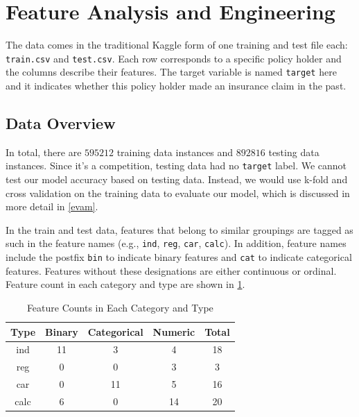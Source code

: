 \documentclass{standalone}
\begin{document}
\section{Feature Analysis and Engineering}\label{preprocessing}

The data comes in the traditional Kaggle form of one training and test file
each: \lstinline{train.csv} and \lstinline{test.csv}. Each row corresponds to a
specific policy holder and the columns describe their features. The target
variable is named \lstinline{target} here and it indicates whether this policy
holder made an insurance claim in the past.

\subsection{Data Overview}

In total, there are $595212$ training data instances and $892816$ testing data instances. Since it's a competition, testing data had no \lstinline{target} label. We cannot test our model accuracy based on testing data. Instead, we would use k-fold and cross validation on the training data to evaluate our model, which is discussed in more detail in \cref{evam}.

In the train and test data, features that belong to similar groupings are
tagged as such in the feature names (e.g., \lstinline{ind}, \lstinline{reg},
\lstinline{car}, \lstinline{calc}). In addition, feature names include the
postfix \lstinline{bin} to indicate binary features and \lstinline{cat} to
indicate categorical features. Features without these designations are either
continuous or ordinal. Feature count in each category and type are shown in \cref{feature_count}.

\begin{table}[!h]
\renewcommand{\arraystretch}{1.3}
\caption{Feature Counts in Each Category and Type}\label{feature_count}
\centering
\begin{tabular}{c|cccc}
\hline
\bfseries Type & \bfseries  Binary & \bfseries  Categorical & \bfseries  Numeric & \bfseries Total \\ \hline
\ttfamily ind & 11 & 3 & 4 & 18 \\ \hline
\ttfamily reg & 0 & 0 & 3 & 3 \\ \hline
\ttfamily car & 0 & 11 & 5 & 16 \\ \hline
\ttfamily calc & 6 & 0 & 14 & 20 \\ \hline
\end{tabular}

\end{table}
\end{document}
